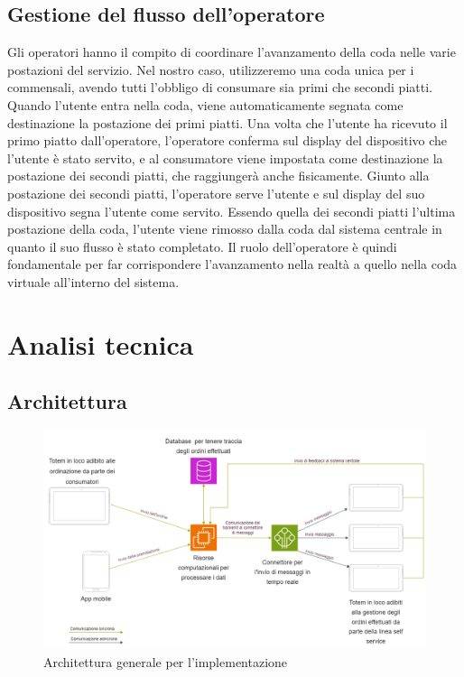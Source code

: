 \documentclass[a4paper, titlepage, 12pt, openright, twoside]{book}
\begin{document}
\subsection{Gestione del flusso dell'operatore}
Gli operatori hanno il compito di coordinare l'avanzamento della coda nelle varie postazioni del servizio.
Nel nostro caso, utilizzeremo una coda unica per i commensali, avendo tutti l'obbligo di consumare sia primi che secondi piatti.
Quando l'utente entra nella coda, viene automaticamente segnata come destinazione la postazione dei primi piatti.
Una volta che l'utente ha ricevuto il primo piatto dall'operatore, l'operatore conferma sul display del dispositivo che l'utente è stato servito,
e al consumatore viene impostata come destinazione la postazione dei secondi piatti, che raggiungerà anche fisicamente.
Giunto alla postazione dei secondi piatti, l'operatore serve l'utente e sul display del suo dispositivo segna l'utente come servito. Essendo quella dei secondi piatti l'ultima
postazione della coda, l'utente viene rimosso dalla coda dal sistema centrale in quanto il suo flusso è stato completato. Il ruolo dell'operatore è quindi fondamentale per far corrispondere l'avanzamento nella realtà a quello nella coda virtuale all'interno del sistema.

\section{Analisi tecnica}

\subsection{Architettura}

\begin{figure}[t]
\caption{Architettura generale per l'implementazione}
\includegraphics[scale=0.40]{architettura}
\centering
\end{figure}
\end{document}
